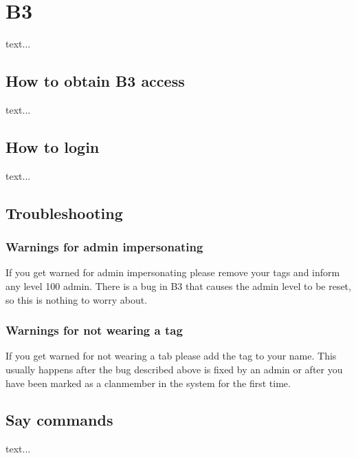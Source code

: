 \chapter{B3}
text...

\section{How to obtain B3 access}
\label{b3:obtain}
text...

\section{How to login}
\label{b3:login}
text...

\section{Troubleshooting}
\label{b3:troubleshooting}

\subsection{Warnings for admin impersonating}
If you get warned for admin impersonating please remove your tags and inform any level 100 admin. There is a bug in B3 that causes the admin level to be reset, so this is nothing to worry about.

\subsection{Warnings for not wearing a tag}
If you get warned for not wearing a tab please add the tag to your name. This usually happens after the bug described above is fixed by an admin or after you have been marked as a clanmember in the system for the first time.

\section{Say commands}
\label{b3:say}
text...